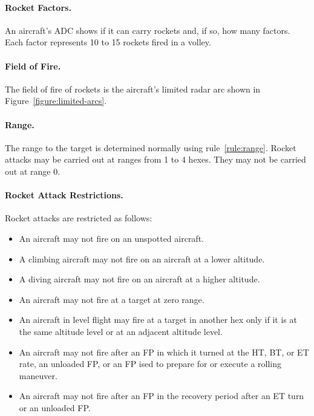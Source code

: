 \begin{advancedrules}
{\paragraph{Rocket Factors.} An aircraft's ADC shows if it can carry rockets and, if so, how many factors. Each factor represents 10 to 15 rockets fired in a volley.

\paragraph{Field of Fire.} The field of fire of rockets is the aircraft's limited radar arc shown in Figure~\ref{figure:limited-arcs}.

\paragraph{Range.} The range to the target is determined normally using rule~\ref{rule:range}. Rocket attacks may be carried out at ranges from 1 to 4 hexes. They may not be carried out at range 0.

\paragraph{Rocket Attack Restrictions.} Rocket attacks are restricted as follows:

\begin{itemize}

    \item An aircraft may not fire on an unspotted aircraft.

    \item A climbing aircraft may not fire on an aircraft at a lower altitude.

    \item A diving aircraft may not fire on an aircraft at a higher altitude.

    \item An aircraft may not fire at a target at zero range.

    \item An aircraft in level flight may fire at a target in another hex only if it is at the same altitude level or at an adjacent altitude level.

    \item An aircraft may not fire after an FP in which it turned at the HT, BT, or ET rate, an unloaded FP, or an FP ised to prepare for or execute a rolling maneuver.

    \item An aircraft may not fire after an FP in the recovery period after an ET turn or an unloaded FP.


\end{itemize}}
\end{advancedrules}

